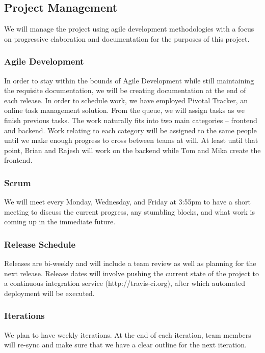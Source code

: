 \documentclass[11pt,letterpaper]{article}
\begin{document}

\subsection{Project Management}
We will manage the project using agile development methodologies with a focus on progressive elaboration and documentation for the purposes of this project.

\subsubsection{Agile Development}
In order to stay within the bounds of Agile Development while still maintaining the requisite documentation, we will be creating documentation at the end of each release.
In order to schedule work, we have employed Pivotal Tracker, an online task management solution.
From the queue, we will assign tasks as we finish previous tasks.
The work naturally fits into two main categories -- frontend and backend.
Work relating to each category will be assigned to the same people until we make enough progress to cross between teams at will.
At least until that point, Brian and Rajesh will work on the backend while Tom and Mika create the frontend.

\subsubsection{Scrum}
We will meet every Monday, Wednesday, and Friday at 3:55pm to have a short meeting to discuss the current progress, any stumbling blocks, and what work is coming up in the immediate future.

\subsubsection{Release Schedule}
Releases are bi-weekly and will include a team review as well as planning for the next release.
Release dates will involve pushing the current state of the project to a continuous integration service (http://travis-ci.org), after which automated deployment will be executed.

\subsubsection{Iterations}
We plan to have weekly iterations.
At the end of each iteration, team members will re-sync and make sure that we have a clear outline for the next iteration.
\end{document}
